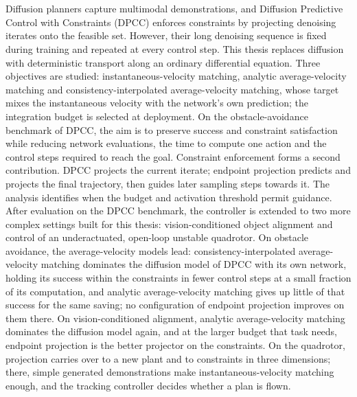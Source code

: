 \chapter{\abstractname}

Diffusion planners capture multimodal demonstrations, and Diffusion Predictive Control with
Constraints (DPCC) enforces constraints by projecting denoising iterates onto the feasible set.
However, their long denoising sequence is fixed during training and repeated at every control step.
This thesis replaces diffusion with deterministic transport along an ordinary differential equation.
Three objectives are studied: instantaneous-velocity matching, analytic average-velocity matching and
consistency-interpolated average-velocity matching, whose target mixes the instantaneous velocity with
the network's own prediction; the integration budget is selected at deployment. On the
obstacle-avoidance benchmark of DPCC, the aim is to preserve success and
constraint satisfaction while reducing network evaluations, the time to compute one action and the
control steps required to reach the goal. Constraint enforcement forms a second contribution. DPCC projects the
current iterate; endpoint projection predicts and projects the final trajectory,
then guides later sampling steps towards it. The analysis identifies when the budget and activation threshold permit guidance. After evaluation on the DPCC benchmark, the controller is extended to two
more complex settings built for this thesis: vision-conditioned object alignment and control of an
underactuated, open-loop unstable quadrotor. On obstacle avoidance, the average-velocity models lead:
consistency-interpolated average-velocity matching dominates the diffusion model of DPCC with its own
network, holding its success within the constraints in fewer control steps at a small fraction of its
computation, and analytic average-velocity matching gives up little of that success for the same
saving; no configuration of endpoint projection improves on them there. On vision-conditioned
alignment, analytic average-velocity matching dominates the diffusion model again, and at the larger
budget that task needs, endpoint projection is the better projector on the constraints. On the
quadrotor, projection carries over to a new plant and to constraints in three dimensions; there,
simple generated demonstrations make instantaneous-velocity matching enough, and the tracking
controller decides whether a plan is flown.
